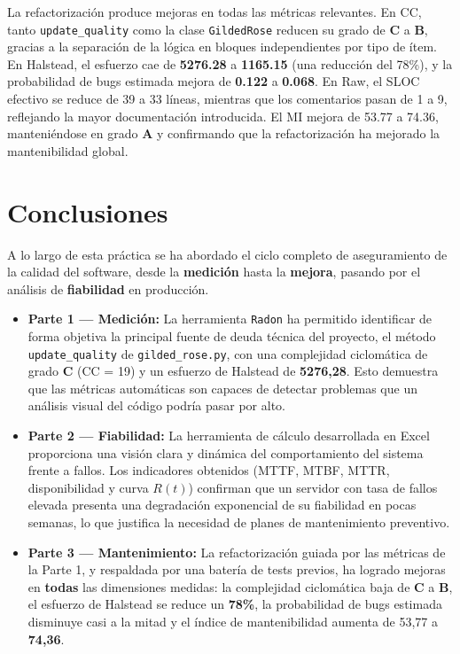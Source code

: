 \documentclass{article}
\newcommand{\good}[1]{\textbf{\textcolor{metGood}{#1}}}
\newcommand{\medium}[1]{\textbf{\textcolor{metMedium}{#1}}}
\newcommand{\bad}[1]{\textbf{\textcolor{metBad}{#1}}}
\begin{document}
La refactorización produce mejoras en todas las métricas relevantes. En CC, tanto \texttt{update\_quality} como la clase \texttt{GildedRose} reducen su grado de \medium{C} a \medium{B}, gracias a la separación de la lógica en bloques independientes por tipo de ítem. En Halstead, el esfuerzo cae de \bad{5276.28} a \medium{1165.15} (una reducción del 78\%), y la probabilidad de bugs estimada mejora de \medium{0.122} a \good{0.068}. En Raw, el SLOC efectivo se reduce de 39 a 33 líneas, mientras que los comentarios pasan de 1 a 9, reflejando la mayor documentación introducida. El MI mejora de 53.77 a 74.36, manteniéndose en grado \good{A} y confirmando que la refactorización ha mejorado la mantenibilidad global.


\newpage
\section{Conclusiones}


A lo largo de esta práctica se ha abordado el ciclo completo de aseguramiento
de la calidad del software, desde la \textbf{medición} hasta la \textbf{mejora}, pasando
por el análisis de \textbf{fiabilidad} en producción.

\begin{itemize}
    \item \textbf{Parte 1 — Medición:} La herramienta \texttt{Radon} ha permitido
          identificar de forma objetiva la principal fuente de deuda técnica del proyecto,
          el método \texttt{update\_quality} de \texttt{gilded\_rose.py}, con una
          complejidad ciclomática de grado \medium{C} (CC = 19) y un esfuerzo de
          Halstead de \bad{5276{,}28}. Esto demuestra que las métricas automáticas son
          capaces de detectar problemas que un análisis visual del código podría pasar por alto.

    \item \textbf{Parte 2 — Fiabilidad:} La herramienta de cálculo desarrollada en
          Excel proporciona una visión clara y dinámica del comportamiento del sistema
          frente a fallos. Los indicadores obtenidos (MTTF, MTBF, MTTR, disponibilidad
          y curva $R(t)$) confirman que un servidor con tasa de fallos elevada presenta
          una degradación exponencial de su fiabilidad en pocas semanas, lo que justifica
          la necesidad de planes de mantenimiento preventivo.

    \item \textbf{Parte 3 — Mantenimiento:} La refactorización guiada por las métricas
          de la Parte 1, y respaldada por una batería de tests previos, ha logrado mejoras
          en \textbf{todas} las dimensiones medidas: la complejidad ciclomática baja de
          \medium{C} a \medium{B}, el esfuerzo de Halstead se reduce un \good{78\%}, la
          probabilidad de bugs estimada disminuye casi a la mitad y el índice de
          mantenibilidad aumenta de 53{,}77 a \good{74{,}36}.
\end{itemize}
\end{document}
